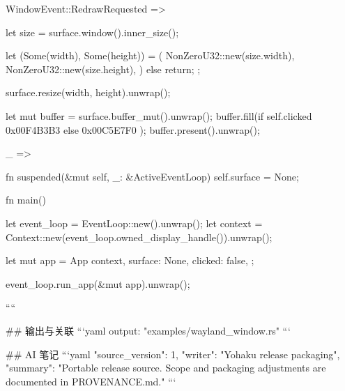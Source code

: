 {{{            WindowEvent::RedrawRequested => {
                let size = surface.window().inner_size();

                let (Some(width), Some(height)) = (
                    NonZeroU32::new(size.width),
                    NonZeroU32::new(size.height),
                ) else {
                    return;
                };

                surface.resize(width, height).unwrap();

                let mut buffer = surface.buffer_mut().unwrap();
                buffer.fill(if self.clicked { 0x00F4B3B3 } else { 0x00C5E7F0 });
                buffer.present().unwrap();
            }

            _ => {}
        }
    }

    fn suspended(&mut self, _: &ActiveEventLoop) {
        self.surface = None;
    }
}

fn main() {
    let event_loop = EventLoop::new().unwrap();
    let context = Context::new(event_loop.owned_display_handle()).unwrap();

    let mut app = App {
        context,
        surface: None,
        clicked: false,
    };

    event_loop.run_app(&mut app).unwrap();
}
````

## 输出与关联
```yaml
output: "examples/wayland_window.rs"
```

## AI 笔记
```yaml
{"source_version": 1, "writer": "Yohaku release packaging", "summary": "Portable release source. Scope and packaging adjustments are documented in PROVENANCE.md."}
```
